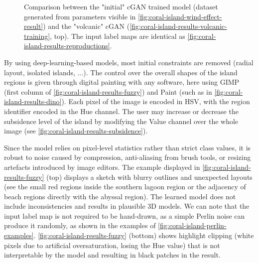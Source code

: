 \begin{figure}
    \caption[Comparison of cGAN trained models]{Comparison between the "initial" cGAN trained model (dataset generated from parameters visible in \cref{fig:coral-island-wind-effect-result}) and the "volcanic" cGAN (\cref{fig:coral-island-results-volcanic-training}, top). The input label maps are identical as \cref{fig:coral-island-results-reproductions}.}
    \label{fig:coral-island-results-reproductions-with-volcano}
\end{figure}

By using deep-learning-based models, most initial constraints are removed (radial layout, isolated islands, ...). The control over the overall shapes of the island regions is given through digital painting with any software, here using GIMP (first column of \cref{fig:coral-island-results-fuzzy}) and Paint (such as in \cref{fig:coral-island-results-dino}). Each pixel of the image is encoded in HSV, with the region identifier encoded in the Hue channel. The user may increase or decrease the subsidence level of the island by modifying the Value channel over the whole image (see \cref{fig:coral-island-results-subsidence}).

Since the model relies on pixel-level statistics rather than strict class values, it is robust to noise caused by compression, anti-aliasing from brush tools, or resizing artefacts introduced by image editors. The example displayed in \cref{fig:coral-island-results-fuzzy} (top) displays a sketch with blurry outlines and unexpected layouts (see the small red regions inside the southern lagoon region or the adjacency of beach regions directly with the abyssal region). The learned model does not include inconsistencies and results in plausible 3D models. We can note that the input label map is not required to be hand-drawn, as a simple Perlin noise can produce it randomly, as shown in the examples of \cref{fig:coral-island-perlin-examples}. \cref{fig:coral-island-results-fuzzy} (bottom) shows highlight clipping (white pixels due to artificial oversaturation, losing the Hue value) that is not interpretable by the model and resulting in black patches in the result. 

